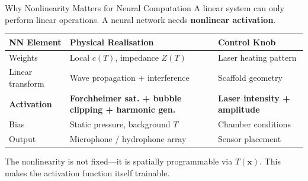 \documentclass[aspectratio=169,11pt]{beamer}
\begin{document}
\begin{frame}{Why Nonlinearity Matters for Neural Computation}
  A linear system can only perform linear operations. A neural network needs \textbf{nonlinear activation}.

  \vspace{0.2cm}
  \begin{table}
    \centering
    \footnotesize
    \renewcommand{\arraystretch}{1.05}
    \begin{tabular}{@{}>{\raggedright}p{3.2cm}>{\raggedright}p{5.2cm}>{\raggedright\arraybackslash}p{4.2cm}@{}}
      \toprule
      \textbf{NN Element} & \textbf{Physical Realisation} & \textbf{Control Knob} \\
      \midrule
      Weights & Local $c(T)$, impedance $Z(T)$ & Laser heating pattern \\
      Linear transform & Wave propagation + interference & Scaffold geometry \\
      \textbf{Activation} & \textbf{Forchheimer sat. + bubble clipping + harmonic gen.} & \textbf{Laser intensity + amplitude} \\
      Bias & Static pressure, background $T$ & Chamber conditions \\
      Output & Microphone / hydrophone array & Sensor placement \\
      \bottomrule
    \end{tabular}
  \end{table}

  \vspace{0.15cm}
  \textcolor{gdpDarkBlue}{\small The nonlinearity is not fixed---it is spatially programmable via $T(\mathbf{x})$. This makes the activation function itself trainable.}
\end{frame}
\end{document}
